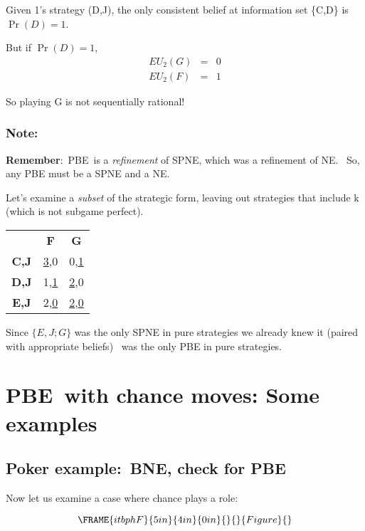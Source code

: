 \documentclass{article}
\begin{document}
Given 1's strategy (D,J), the only consistent belief at information set
\{C,D\} is $\Pr (D)=1$.

But if $\Pr (D)=1$,
\begin{eqnarray*}
EU_{2}(G) &=&0 \\
EU_{2}(F) &=&1
\end{eqnarray*}

So playing G is not sequentially rational!

\bigskip

\bigskip

\subsubsection{\textbf{Note:}}

\textbf{Remember}:\ PBE\ is a \textit{refinement }of SPNE, which was a
refinement of NE. \ So, any PBE must be a SPNE and a NE. \

Let's examine a \textit{subset} of the strategic form, leaving out
strategies that include k (which is not subgame perfect).

\begin{tabular}{ccc}
& \textbf{F} & \textbf{G} \\
\textbf{C,J} & \underline{3},0 & 0,\underline{1} \\
\textbf{D,J} & 1,\underline{1} & \underline{2},0 \\
\textbf{E,J} & 2,\underline{0} & \underline{2},\underline{0}%
\end{tabular}

Since $\{E,J;G\}$ was the only SPNE in pure strategies we already knew it
(paired with appropriate beliefs) \ was the only PBE in pure strategies.

\bigskip

\section{PBE\ with chance moves: Some examples}

\subsection{Poker example:\ BNE, check for PBE}

Now let us examine a case where chance plays a role:\bigskip

\begin{equation}
\FRAME{itbphF}{5in}{4in}{0in}{}{}{Figure}{\special{language "Scientific
Word";type "GRAPHIC";maintain-aspect-ratio TRUE;display "USEDEF";valid_file
"T";width 5in;height 4in;depth 0in;original-width 4.6799in;original-height
3.584in;cropleft "0";croptop "1";cropright "1";cropbottom "0";tempfilename
'JSHANV35.wmf';tempfile-properties "XPR";}}
\end{equation}
\end{document}
